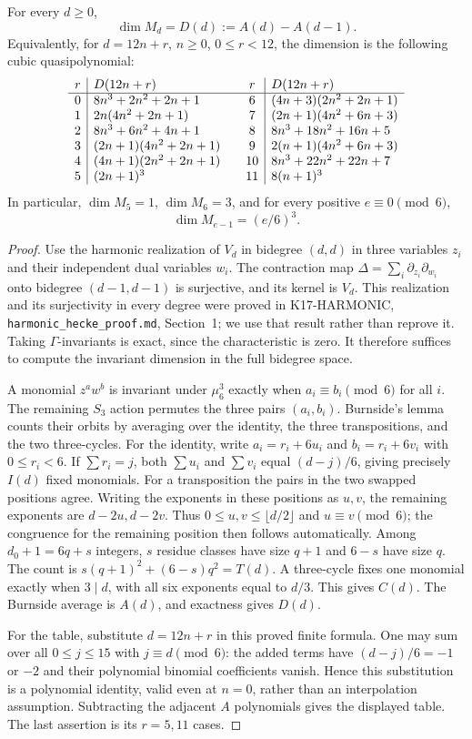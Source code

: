 \begin{theorem}[KT-U3-DIM]
For every $d\geq0$,
\[
       \dim M_d=D(d):=A(d)-A(d-1).
\]
Equivalently, for $d=12n+r$, $n\geq0$, $0\leq r<12$, the
dimension is the following cubic quasipolynomial:
\[
\begin{array}{c|l@{\qquad}c|l}
r&D(12n+r)&r&D(12n+r)\\\hline
0&8n^3+2n^2+2n+1&6&(4n+3)(2n^2+2n+1)\\
1&2n(4n^2+2n+1)&7&(2n+1)(4n^2+6n+3)\\
2&8n^3+6n^2+4n+1&8&8n^3+18n^2+16n+5\\
3&(2n+1)(4n^2+2n+1)&9&2(n+1)(4n^2+6n+3)\\
4&(4n+1)(2n^2+2n+1)&10&8n^3+22n^2+22n+7\\
5&(2n+1)^3&11&8(n+1)^3
\end{array}
\]
In particular, $\dim M_5=1$, $\dim M_6=3$, and for every
positive $e\equiv0\pmod6$,
\[
                    \dim M_{e-1}=(e/6)^3.
\]
\end{theorem}
\begin{proof}
Use the harmonic realization of $V_d$ in bidegree $(d,d)$ in
three variables $z_i$ and their independent dual variables $w_i$.
The contraction map
$\Delta=\sum_i\partial_{z_i}\partial_{w_i}$ onto bidegree
$(d-1,d-1)$ is surjective, and its kernel is $V_d$.
This realization and its surjectivity in every degree were proved in
K17-HARMONIC, \texttt{harmonic\_hecke\_proof.md}, Section~1;
we use that result rather than reprove it.
Taking $\Gamma$-invariants is exact, since the characteristic is zero.
It therefore suffices to compute the invariant dimension in the full
bidegree space.

A monomial $z^a w^b$ is invariant under $\mu_6^3$ exactly when
$a_i\equiv b_i\pmod6$ for all $i$.
The remaining $S_3$ action permutes the three pairs $(a_i,b_i)$.
Burnside's lemma counts their orbits by averaging over the identity,
the three transpositions, and the two three-cycles.
For the identity, write $a_i=r_i+6u_i$ and $b_i=r_i+6v_i$ with
$0\leq r_i<6$. If $\sum r_i=j$, both $\sum u_i$ and $\sum v_i$
equal $(d-j)/6$, giving precisely $I(d)$ fixed monomials.
For a transposition the pairs in the two swapped positions agree.
Writing the exponents in these positions as $u,v$, the remaining
exponents are $d-2u,d-2v$. Thus $0\leq u,v\leq\lfloor d/2\rfloor$
and $u\equiv v\pmod6$; the congruence for the remaining position
then follows automatically. Among $d_0+1=6q+s$ integers, $s$
residue classes have size $q+1$ and $6-s$ have size $q$.
The count is $s(q+1)^2+(6-s)q^2=T(d)$.
A three-cycle fixes one monomial exactly when $3\mid d$, with
all six exponents equal to $d/3$. This gives $C(d)$.
The Burnside average is $A(d)$, and exactness gives $D(d)$.

For the table, substitute $d=12n+r$ in this proved finite formula.
One may sum over all $0\leq j\leq15$ with $j\equiv d\pmod6$:
the added terms have $(d-j)/6=-1$ or $-2$ and their polynomial
binomial coefficients vanish. Hence this substitution is a polynomial
identity, valid even at $n=0$, rather than an interpolation assumption.
Subtracting the adjacent $A$ polynomials gives the displayed table.
The last assertion is its $r=5,11$ cases.
\end{proof}

